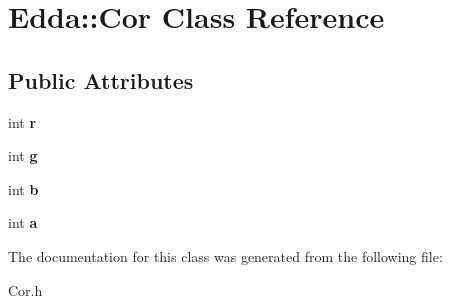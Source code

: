 \hypertarget{class_edda_1_1_cor}{
\section{Edda::Cor Class Reference}
\label{class_edda_1_1_cor}
}
\subsection*{Public Attributes}
\begin{DoxyCompactItemize}
\item 
\hypertarget{class_edda_1_1_cor_a2797d86a904dfa765297c342de7b030f}{
int {\bfseries r}}
\label{class_edda_1_1_cor_a2797d86a904dfa765297c342de7b030f}

\item 
\hypertarget{class_edda_1_1_cor_a65c778444daee740522aa93eccbf776f}{
int {\bfseries g}}
\label{class_edda_1_1_cor_a65c778444daee740522aa93eccbf776f}

\item 
\hypertarget{class_edda_1_1_cor_a1483312898fc65da9c3c57b89c32fb91}{
int {\bfseries b}}
\label{class_edda_1_1_cor_a1483312898fc65da9c3c57b89c32fb91}

\item 
\hypertarget{class_edda_1_1_cor_a4fa3913e99eb13b7ed15e8b82106f8ff}{
int {\bfseries a}}
\label{class_edda_1_1_cor_a4fa3913e99eb13b7ed15e8b82106f8ff}

\end{DoxyCompactItemize}


The documentation for this class was generated from the following file:\begin{DoxyCompactItemize}
\item 
Cor.h\end{DoxyCompactItemize}
